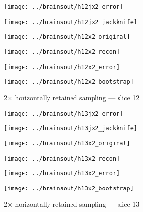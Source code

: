 \documentclass[review,supplement,onefignum,onetabnum,juq]{siamonline181217}
\begin{document}
\begin{figure}
\begin{centering}

\parbox{\imsize}{\texttt{[image: ../brainsout/h12jx2\_error]}}
\parbox{\imsize}{\texttt{[image: ../brainsout/h12jx2\_jackknife]}}

\vspace{\vertsep}

\parbox{\imsize}{\texttt{[image: ../brainsout/h12x2\_original]}}
\parbox{\imsize}{\texttt{[image: ../brainsout/h12x2\_recon]}}

\vspace{\vertsep}

\parbox{\imsize}{\texttt{[image: ../brainsout/h12x2\_error]}}
\parbox{\imsize}{\texttt{[image: ../brainsout/h12x2\_bootstrap]}}

\end{centering}
\caption{2$\times$ horizontally retained sampling --- slice 12}
\end{figure}


\begin{figure}
\begin{centering}

\parbox{\imsize}{\texttt{[image: ../brainsout/h13jx2\_error]}}
\parbox{\imsize}{\texttt{[image: ../brainsout/h13jx2\_jackknife]}}

\vspace{\vertsep}

\parbox{\imsize}{\texttt{[image: ../brainsout/h13x2\_original]}}
\parbox{\imsize}{\texttt{[image: ../brainsout/h13x2\_recon]}}

\vspace{\vertsep}

\parbox{\imsize}{\texttt{[image: ../brainsout/h13x2\_error]}}
\parbox{\imsize}{\texttt{[image: ../brainsout/h13x2\_bootstrap]}}

\end{centering}
\caption{2$\times$ horizontally retained sampling --- slice 13}
\end{figure}
\end{document}
